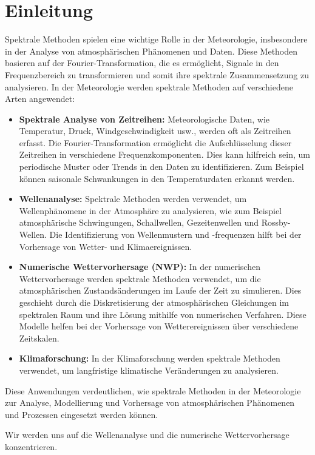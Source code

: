 %
%
%
%
\section{Einleitung\label{spektral:section:Einleitung}}

Spektrale Methoden spielen eine wichtige Rolle in der Meteorologie, insbesondere in der Analyse von atmosphärischen Phänomenen und Daten.
Diese Methoden basieren auf der Fourier-Trans\-for\-ma\-tion, die es ermöglicht, Signale in den Frequenzbereich zu transformieren und somit ihre spektrale Zusammensetzung zu analysieren.
In der Meteorologie werden spektrale Methoden auf verschiedene Arten angewendet:

\begin{itemize}
\item
\textbf{Spektrale Analyse von Zeitreihen:} Meteorologische Daten, wie Temperatur, Druck, Windgeschwindigkeit usw., werden oft als Zeitreihen erfasst.
Die Fourier-Transformation ermöglicht die Aufschlüsselung dieser Zeitreihen in verschiedene Frequenzkomponenten.
Dies kann hilfreich sein, um periodische Muster oder Trends in den Daten zu identifizieren. 
Zum Beispiel können saisonale Schwankungen in den Temperaturdaten erkannt werden.
\item
\textbf{Wellenanalyse:} Spektrale Methoden werden verwendet, um Wellenphänomene in der Atmosphäre zu analysieren, wie zum Beispiel atmosphärische Schwingungen, Schallwellen, Gezeitenwellen und Rossby-Wellen.
Die Identifizierung von Wellenmustern und -frequenzen hilft bei der Vorhersage von Wetter- und Klimaereignissen.
\item
\textbf{Numerische Wettervorhersage (NWP):} In der numerischen Wettervorhersage werden spektrale Methoden verwendet, um die atmosphärischen Zustandsänderungen im Laufe der Zeit zu simulieren.
Dies geschieht durch die Diskretisierung der atmosphärischen Gleichungen im spektralen Raum und ihre Lösung mithilfe von numerischen Verfahren.
Diese Modelle helfen bei der Vorhersage von Wetterereignissen über verschiedene Zeitskalen.
\item
\textbf{Klimaforschung:} In der Klimaforschung werden spektrale Methoden verwendet, um langfristige klimatische Veränderungen zu analysieren.
\end{itemize}

Diese Anwendungen verdeutlichen, wie spektrale Methoden in der Meteorologie zur Analyse, Modellierung und Vorhersage von atmosphärischen Phänomenen und Prozessen eingesetzt werden können.

Wir werden uns auf die Wellenanalyse und die numerische Wettervorhersage konzentrieren.